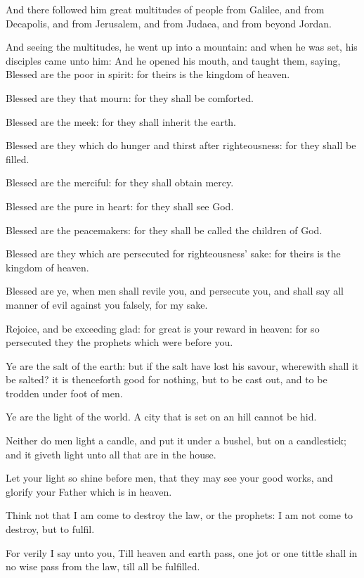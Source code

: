 \Verse And there followed him great multitudes of people from Galilee, and from Decapolis, and from Jerusalem, and from Judaea, and from beyond Jordan.


\Chapter
\Verse And seeing the multitudes, he went up into a mountain: and when he was set, his disciples came unto him: \Verse And he opened his mouth, and taught them, saying, \Verse Blessed are the poor in spirit: for theirs is the kingdom of heaven.

\Verse Blessed are they that mourn: for they shall be comforted.

\Verse Blessed are the meek: for they shall inherit the earth.

\Verse Blessed are they which do hunger and thirst after righteousness: for they shall be filled.

\Verse Blessed are the merciful: for they shall obtain mercy.

\Verse Blessed are the pure in heart: for they shall see God.

\Verse Blessed are the peacemakers: for they shall be called the children of God.

\Verse Blessed are they which are persecuted for righteousness' sake: for theirs is the kingdom of heaven.

\Verse Blessed are ye, when men shall revile you, and persecute you, and shall say all manner of evil against you falsely, for my sake.

\Verse Rejoice, and be exceeding glad: for great is your reward in heaven: for so persecuted they the prophets which were before you.

\Verse Ye are the salt of the earth: but if the salt have lost his savour, wherewith shall it be salted? it is thenceforth good for nothing, but to be cast out, and to be trodden under foot of men.

\Verse Ye are the light of the world. A city that is set on an hill cannot be hid.

\Verse Neither do men light a candle, and put it under a bushel, but on a candlestick; and it giveth light unto all that are in the house.

\Verse Let your light so shine before men, that they may see your good works, and glorify your Father which is in heaven.

\Verse Think not that I am come to destroy the law, or the prophets: I am not come to destroy, but to fulfil.

\Verse For verily I say unto you, Till heaven and earth pass, one jot or one tittle shall in no wise pass from the law, till all be fulfilled.

